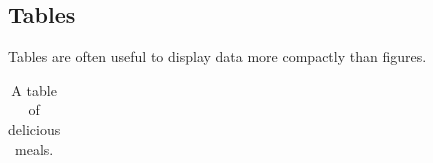 \documentclass[12pt]{article}
\begin{document}
\subsection{Tables}
Tables are often useful to display data more compactly than figures.

\begin{table}[h]
\begin{centering}
  \begin{tabular}{| l | c |}
   \hline 
     
   \hline
  \end{tabular}
  \caption{A table of delicious meals. \label{tab:1}}
  \end{centering}
\end{table}

%
%
\end{document}
